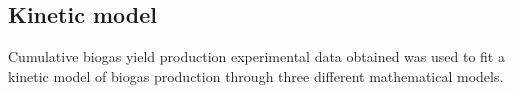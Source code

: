 \subsection{Kinetic model}
Cumulative biogas yield production experimental data obtained was used to fit a kinetic model of biogas production through three different mathematical models.